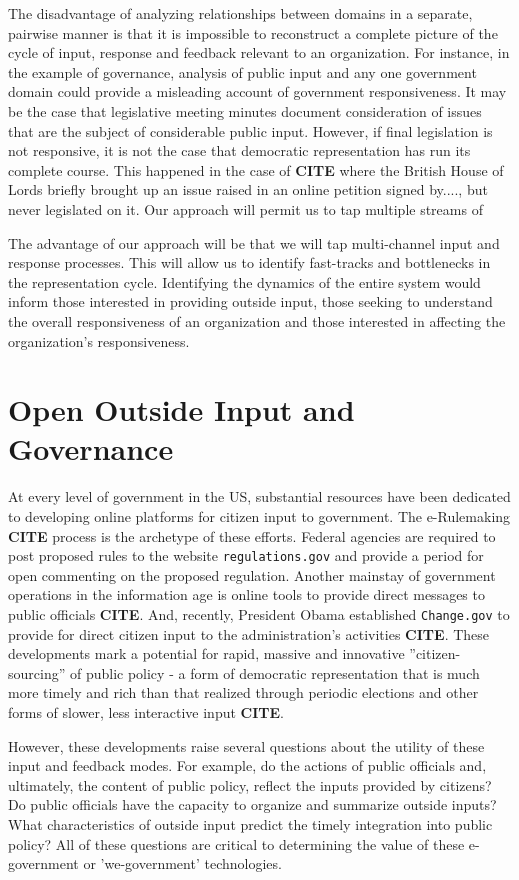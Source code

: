 The disadvantage of analyzing relationships between domains in a separate, pairwise manner is that it is impossible to reconstruct a complete picture of the cycle of input, response and feedback relevant to an organization. For instance, in the example of governance, analysis of public input and any one government domain could provide a misleading account of government responsiveness. It may be the case that legislative meeting minutes document consideration of issues that are the subject of considerable public input. However, if final legislation is not responsive, it is not the case that democratic representation has run its complete course. This happened in the case of {\bf CITE} where the British House of Lords briefly brought up an issue raised in an online petition signed by...., but never legislated on it. Our approach will permit us to tap multiple streams of 

The advantage of our approach will be that we will tap multi-channel input and response processes. This will allow us to identify fast-tracks and bottlenecks in the representation cycle. Identifying the dynamics of the entire system would inform those interested in providing outside input, those seeking to understand the overall responsiveness of an organization and those interested in affecting the organization's responsiveness.
\section{Open Outside Input and Governance}

At every level of government in the US, substantial resources have been dedicated to developing online platforms for citizen input to government. The e-Rulemaking {\bf CITE} process is the archetype of these efforts. Federal agencies are required to post proposed rules to the website \texttt{regulations.gov} and provide a period for open commenting on the proposed regulation. Another mainstay of government operations in the information age is online tools to provide direct messages to public officials {\bf CITE}. And, recently, President Obama established \texttt{Change.gov} to provide for direct citizen input to the administration's activities {\bf CITE}. These developments mark a potential for rapid, massive and innovative ''citizen-sourcing'' of public policy - a form of democratic representation that is much more timely and rich than that realized through periodic elections and other forms of slower, less interactive input {\bf CITE}.  

However, these developments raise several questions about the utility of these input and feedback modes. For example, do the actions of public officials and, ultimately, the content of public policy, reflect the inputs provided by citizens? Do public officials have the capacity to organize and summarize outside inputs? What characteristics of outside input predict the timely integration into public policy? All of these questions are critical to determining the value of these e-government or 'we-government' technologies.

